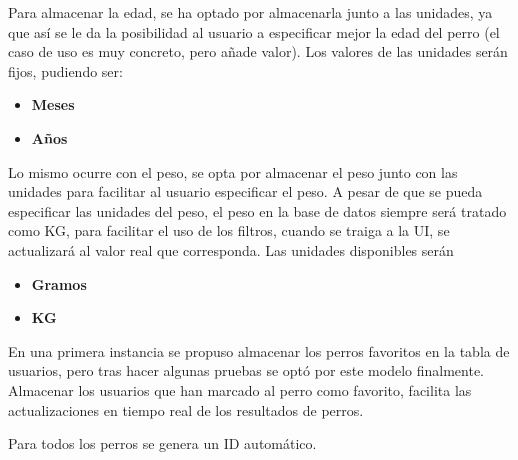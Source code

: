 \documentclass[a4paper, 12pt]{article}
\begin{document}
Para almacenar la edad, se ha optado por almacenarla junto a las unidades, ya que así se le da la posibilidad al usuario a especificar mejor la edad del perro (el caso de uso es muy concreto, pero añade valor). Los valores de las unidades serán fijos, pudiendo ser:
	\begin{itemize}
		\item \textbf{Meses}
		\item \textbf{Años}
	\end{itemize}

Lo mismo ocurre con el peso, se opta por almacenar el peso junto con las unidades para facilitar al usuario especificar el peso. A pesar de que se pueda especificar las unidades del peso, el peso en la base de datos siempre será tratado como KG, para facilitar el uso de los filtros, cuando se traiga a la UI, se actualizará al valor real que corresponda. Las unidades disponibles serán
	\begin{itemize}
		\item \textbf{Gramos}
		\item \textbf{KG}
	\end{itemize}

En una primera instancia se propuso almacenar los perros favoritos en la tabla de usuarios, pero tras hacer algunas pruebas se optó por este modelo finalmente. Almacenar los usuarios que han marcado al perro como favorito, facilita las actualizaciones en tiempo real de los resultados de perros.

Para todos los perros se genera un ID automático.
\end{document}
